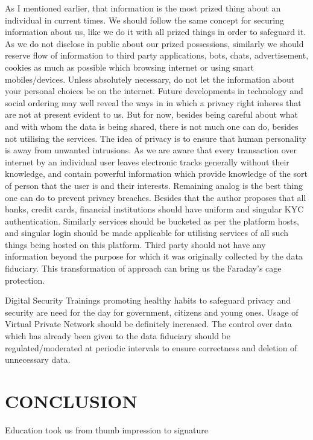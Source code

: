 \begin{multicols}{2}
As I mentioned earlier, that information is the most prized thing about an individual in current times. We should follow the same concept for securing information about us, like we do it with all prized things in order to safeguard it. As we do not disclose in public about our prized possessions, similarly we should reserve flow of information to third party applications, bots, chats, advertisement, cookies as much as possible which browsing internet or using smart mobiles/devices. Unless absolutely necessary, do not let the information about your personal choices be on the internet. Future developments in technology and social ordering may well reveal the ways in in which a privacy right inheres that are not at present evident to us. But for now, besides being careful about what and with whom the data is being shared, there is not much one can do, besides not utilising the services. The idea of privacy is to ensure that human personality is away from unwanted intrusions. As we are aware that every transaction over internet by an individual user leaves electronic tracks generally without their knowledge, and contain powerful information which provide knowledge of the sort of person that the user is and their interests. Remaining analog is the best thing one can do to prevent privacy breaches. Besides that the author proposes that all banks, credit cards, financial institutions should have uniform and singular KYC authentication. Similarly services should be bucketed as per the platform hosts, and singular login should be made applicable for utilising services of all such things being hosted on this platform. Third party should not have any information beyond the purpose for which it was originally collected by the data fiduciary. This transformation of approach can bring us the Faraday’s cage protection. 

\vskip 0.3cm

Digital Security Trainings promoting healthy habits to safeguard privacy and security are need for the day for government, citizens and young ones. Usage of Virtual Private Network should be definitely increased. The control over data which has already been given to the data fiduciary should be regulated/moderated at periodic intervals to ensure correctness and deletion of unnecessary data. 

\section{CONCLUSION}

Education took us from thumb impression to signature


\end{multicols}
